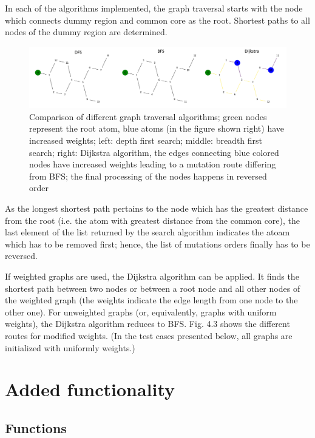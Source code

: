 In each of the algorithms implemented, the graph traversal starts
with the node which connects dummy region and common core as the root.
Shortest paths to all nodes of the dummy region are determined.

\begin{figure}

\includegraphics[scale=0.45]{dfs_bfs_dijkstra_comp1}\caption{Comparison of different graph traversal algorithms; green nodes represent the root atom, blue atoms (in the figure shown right) have increased weights; left: depth first
search; middle: breadth first search; right: Dijkstra algorithm, the
edges connecting blue colored nodes have increased weights leading
to a mutation route differing from BFS; the final processing of the
nodes happens in reversed order}

\end{figure}

As the longest shortest path pertains to the node which has the greatest
distance from the root (i.e. the atom with greatest distance from
the common core), the last element of the list returned by the search algorithm indicates the atoam which has to be removed first; hence, the list of mutations orders finally has to be reversed.

If weighted graphs are used, the Dijkstra algorithm can be applied.
It finds the shortest path between two nodes or between a root node
and all other nodes of the weighted graph (the weights indicate the
edge length from one node to the other one). For unweighted graphs
(or, equivalently, graphs with uniform weights), the Dijkstra algorithm
reduces to BFS. Fig. 4.3 shows the different routes for modified weights.
(In the test cases presented below, all graphs are initialized with uniformly weights.)

\section{Added functionality}

\subsection{Functions}


